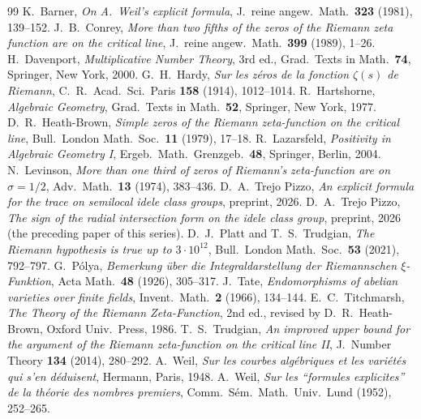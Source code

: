 \documentclass[11pt]{amsart}
\theoremstyle{definition}
\theoremstyle{remark}
\begin{document}
\begin{thebibliography}{99}
 K.~Barner, \emph{On A.~Weil's explicit formula}, J.~reine angew.\ Math.\ \textbf{323} (1981), 139--152.
 J.~B.~Conrey, \emph{More than two fifths of the zeros of the Riemann zeta function are on the critical line},
J.~reine angew.\ Math.\ \textbf{399} (1989), 1--26.
 H.~Davenport, \emph{Multiplicative Number Theory}, 3rd ed., Grad.\ Texts in Math.\ \textbf{74}, Springer, New York, 2000.
 G.~H.~Hardy, \emph{Sur les z\'eros de la fonction $\zeta(s)$ de Riemann}, C.~R.~Acad.\ Sci.\ Paris \textbf{158} (1914), 1012--1014.
 R.~Hartshorne, \emph{Algebraic Geometry}, Grad.\ Texts in Math.\ \textbf{52}, Springer, New York, 1977.
 D.~R.~Heath-Brown, \emph{Simple zeros of the Riemann zeta-function on the critical line}, Bull.\ London Math.\ Soc.\ \textbf{11} (1979), 17--18.
 R.~Lazarsfeld, \emph{Positivity in Algebraic Geometry I}, Ergeb.\ Math.\ Grenzgeb.\ \textbf{48}, Springer, Berlin, 2004.
 N.~Levinson, \emph{More than one third of zeros of Riemann's zeta-function are on $\sigma=1/2$}, Adv.\ Math.\ \textbf{13} (1974), 383--436.
 D.~A.~Trejo Pizzo, \emph{An explicit formula for the trace on semilocal idele class groups}, preprint, 2026.
 D.~A.~Trejo Pizzo, \emph{The sign of the radial intersection form on the idele class group}, preprint, 2026 (the preceding paper of this series).
 D.~J.~Platt and T.~S.~Trudgian, \emph{The Riemann hypothesis is true up to $3\cdot10^{12}$}, Bull.\ London Math.\ Soc.\ \textbf{53} (2021), 792--797.
 G.~P\'olya, \emph{Bemerkung \"uber die Integraldarstellung der Riemannschen $\xi$-Funktion}, Acta Math.\ \textbf{48} (1926), 305--317.
 J.~Tate, \emph{Endomorphisms of abelian varieties over finite fields}, Invent.\ Math.\ \textbf{2} (1966), 134--144.
 E.~C.~Titchmarsh, \emph{The Theory of the Riemann Zeta-Function}, 2nd ed., revised by D.~R.~Heath-Brown, Oxford Univ.\ Press, 1986.
 T.~S.~Trudgian, \emph{An improved upper bound for the argument of the Riemann zeta-function on the critical line II}, J.~Number Theory \textbf{134} (2014), 280--292.
 A.~Weil, \emph{Sur les courbes alg\'ebriques et les vari\'et\'es qui s'en d\'eduisent}, Hermann, Paris, 1948.
 A.~Weil, \emph{Sur les ``formules explicites'' de la th\'eorie des nombres premiers}, Comm.~S\'em.~Math.~Univ.~Lund (1952), 252--265.
\end{thebibliography}
\end{document}

